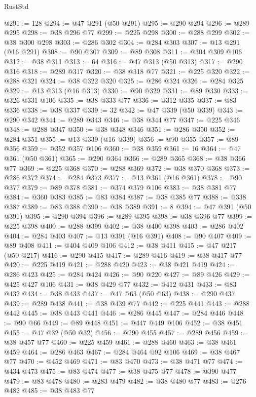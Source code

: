 \begin{lexlean}{RustStd}
\begin{coremodule}
@291 := 128
@294 := @47 @291 (@50 @291)
@295 := @290 @294
@296 := @289 @295
@298 := @38 @296 @77
@299 := @225 @298
@300 := @288 @299
@302 := @38 @300 @298
@303 := @286 @302
@304 := @284 @303
@307 := @13 @291 (@16 @291)
@308 := @90 @307
@309 := @89 @308
@311 := @304 @309 @106
@312 := @38 @311
@313 := 64
@316 := @47 @313 (@50 @313)
@317 := @290 @316
@318 := @289 @317
@320 := @38 @318 @77
@321 := @225 @320
@322 := @288 @321
@324 := @38 @322 @320
@325 := @286 @324
@326 := @284 @325
@329 := @13 @313 (@16 @313)
@330 := @90 @329
@331 := @89 @330
@333 := @326 @331 @106
@335 := @38 @333 @77
@336 := @312 @335
@337 := @83 @336
@338 := @38 @337
@339 := 32
@342 := @47 @339 (@50 @339)
@343 := @290 @342
@344 := @289 @343
@346 := @38 @344 @77
@347 := @225 @346
@348 := @288 @347
@350 := @38 @348 @346
@351 := @286 @350
@352 := @284 @351
@355 := @13 @339 (@16 @339)
@356 := @90 @355
@357 := @89 @356
@359 := @352 @357 @106
@360 := @38 @359
@361 := 16
@364 := @47 @361 (@50 @361)
@365 := @290 @364
@366 := @289 @365
@368 := @38 @366 @77
@369 := @225 @368
@370 := @288 @369
@372 := @38 @370 @368
@373 := @286 @372
@374 := @284 @373
@377 := @13 @361 (@16 @361)
@378 := @90 @377
@379 := @89 @378
@381 := @374 @379 @106
@383 := @38 @381 @77
@384 := @360 @383
@385 := @83 @384
@387 := @38 @385 @77
@388 := @338 @387
@389 := @83 @388
@390 := @38 @389
@391 := 8
@394 := @47 @391 (@50 @391)
@395 := @290 @394
@396 := @289 @395
@398 := @38 @396 @77
@399 := @225 @398
@400 := @288 @399
@402 := @38 @400 @398
@403 := @286 @402
@404 := @284 @403
@407 := @13 @391 (@16 @391)
@408 := @90 @407
@409 := @89 @408
@411 := @404 @409 @106
@412 := @38 @411
@415 := @47 @217 (@50 @217)
@416 := @290 @415
@417 := @289 @416
@419 := @38 @417 @77
@420 := @225 @419
@421 := @288 @420
@423 := @38 @421 @419
@424 := @286 @423
@425 := @284 @424
@426 := @90 @220
@427 := @89 @426
@429 := @425 @427 @106
@431 := @38 @429 @77
@432 := @412 @431
@433 := @83 @432
@434 := @38 @433
@437 := @47 @63 (@50 @63)
@438 := @290 @437
@439 := @289 @438
@441 := @38 @439 @77
@442 := @225 @441
@443 := @288 @442
@445 := @38 @443 @441
@446 := @286 @445
@447 := @284 @446
@448 := @90 @66
@449 := @89 @448
@451 := @447 @449 @106
@452 := @38 @451
@455 := @47 @32 (@50 @32)
@456 := @290 @455
@457 := @289 @456
@459 := @38 @457 @77
@460 := @225 @459
@461 := @288 @460
@463 := @38 @461 @459
@464 := @286 @463
@467 := @284 @464 @92 @106
@469 := @38 @467 @77
@470 := @452 @469
@471 := @83 @470
@473 := @38 @471 @77
@474 := @434 @473
@475 := @83 @474
@477 := @38 @475 @77
@478 := @390 @477
@479 := @83 @478
@480 := @283 @479
@482 := @38 @480 @77
@483 := @276 @482
@485 := @38 @483 @77

\end{coremodule}
\end{lexlean}
